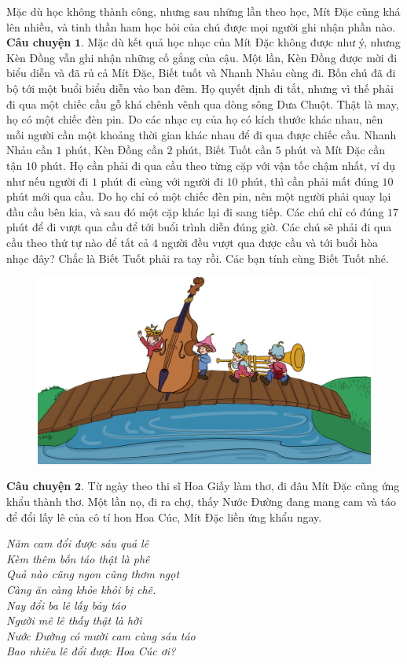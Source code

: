 	Mặc dù học không thành công, nhưng sau những lần theo học, Mít Đặc cũng khá lên nhiều, và tinh thần ham học hỏi của chú được mọi người ghi nhận phần nào.
	\vskip 0.1cm
	\textbf{\color{toancuabi}Câu chuyện} $\pmb{1.}$ Mặc dù kết quả học nhạc của Mít Đặc không được như ý, nhưng Kèn Đồng vẫn ghi nhận những cố gắng của cậu. Một lần, Kèn Đồng được mời đi biểu diễn và đã rủ cả Mít Đặc, Biết tuốt và Nhanh Nhảu cùng đi. Bốn chú đã đi bộ tới một buổi biểu diễn vào ban đêm. Họ quyết định đi tắt, nhưng vì thế phải đi qua một chiếc cầu gỗ khá chênh vênh qua dòng sông Dưa Chuột. Thật là may, họ có một chiếc đèn pin. Do các nhạc cụ của họ có kích thước khác nhau, nên mỗi người cần một khoảng thời gian khác nhau để đi qua được chiếc cầu. Nhanh Nhảu cần $1$ phút, Kèn Đồng cần $2$ phút, Biết Tuốt cần $5$ phút và Mít Đặc cần tận $10$ phút. Họ cần phải đi qua cầu theo từng cặp với vận tốc chậm nhất, ví dụ như nếu người đi $1$ phút đi cùng với người đi $10$ phút, thì cần phải mất đúng $10$ phút mới qua cầu. Do họ chỉ có một chiếc đèn pin, nên một người phải quay lại đầu cầu bên kia, và sau đó một cặp khác lại đi sang tiếp. Các chú chỉ có đúng $17$ phút để đi vượt qua cầu để tới buổi trình diễn đúng giờ. Các chú sẽ phải đi qua cầu theo thứ tự nào để tất cả $4$ người đều vượt qua được cầu và tới buổi hòa nhạc đây? Chắc là Biết Tuốt phải ra tay rồi. Các bạn tính cùng Biết Tuốt nhé.
	\begin{figure}[H]
		\centering
		\vspace*{-5pt}
		\captionsetup{labelformat= empty, justification=centering}
		\includegraphics[width=0.6\linewidth]{Hinh3_KhiengNhacCu}
		\vspace*{-5pt}
	\end{figure}
	\textbf{\color{toancuabi}Câu chuyện} $\pmb{2.}$ Từ ngày theo thi sĩ Hoa Giấy làm thơ, đi đâu Mít Đặc cũng ứng khẩu thành thơ. Một lần nọ, đi ra chợ, thấy Nước Đường đang mang cam và táo để đổi lấy lê của cô tí hon Hoa Cúc, Mít Đặc liền ứng khẩu ngay.
	\vskip 0.1cm
	\begin{adjustwidth}{90pt}{0pt}
				\begin{flushleft}
					\textit{Năm cam đổi được sáu quả lê\\
			Kèm thêm bốn táo thật là phê\\
			Quả nào cũng ngon cũng thơm ngọt\\
			Càng ăn càng khỏe khỏi bị chê.\\
			Nay đổi ba lê lấy bảy táo\\
			Người mê lê thấy thật là hời\\
			Nước Đường có mười cam cùng sáu táo\\
			Bao nhiêu lê đổi được Hoa Cúc ơi?}
				\end{flushleft}
	\end{adjustwidth}
